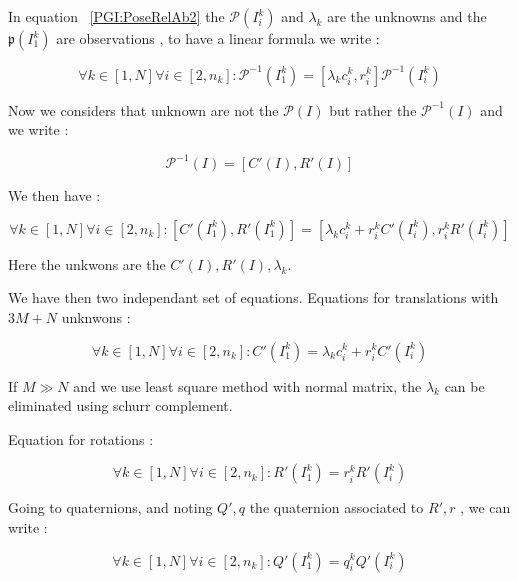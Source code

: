 In equation ~\ref{PGI:PoseRelAb2}  the $\mathcal{P}(I^k_i)$ and $\lambda_k$ are the unknowns and the $\mathfrak{p}(I^k_1) $
are observations , to have  a linear formula we write :


\begin{equation}
     \forall k \in [1,N]   \forall i \in [2,n_k]  :
           \mathcal{P}^{-1}(I^k_1) = [\lambda_k c^k_i, r^k_i]  \mathcal{P}^{-1} (I^k_i)
   \label{PGI:PoseRelAb3}
\end{equation}

Now we considers that unknown are not the  $\mathcal{P}(I)$  but rather the $\mathcal{P}^{-1}(I)$ and we write :

\begin{equation}
      \mathcal{P}^{-1}(I) = [C'(I),R'(I)]
\end{equation}

We then have :

\begin{equation}
     \forall k \in [1,N]   \forall i \in [2,n_k]  :
           [C'(I^k_1),R'(I^k_1)]  = [\lambda_k c^k_i + r^k_i C'(I^k_i) , r^k_i R'(I^k_i)]  
   \label{PGI:PoseRelAb3}
\end{equation}

Here the unkwons are the $C'(I),R'(I),\lambda_k$.

We have then two independant set of equations. Equations for translations  with  $3M+N$ unknwons :

\begin{equation}
     \forall k \in [1,N]   \forall i \in [2,n_k]  :
     C'(I^k_1) = \lambda_k c^k_i + r^k_i C'(I^k_i)  
     \label{PGI:EqTrans}
\end{equation}

If $M \gg N$ and we use least square method with normal matrix, the $\lambda_k $ can be eliminated
using schurr complement.


Equation for rotations :

\begin{equation}
     \forall k \in [1,N]   \forall i \in [2,n_k]  :
           R'(I^k_1)  =  r^k_i R'(I^k_i)
   \label{PGI:PoseRelAb3}
\end{equation}


Going to quaternions, and noting $Q',q$ the quaternion associated to $R',r$ , we can write :

\begin{equation}
     \forall k \in [1,N]   \forall i \in [2,n_k]  :
           Q'(I^k_1)  =  q^k_i Q'(I^k_i)
   \label{PGI:EqQuat1}
\end{equation}

